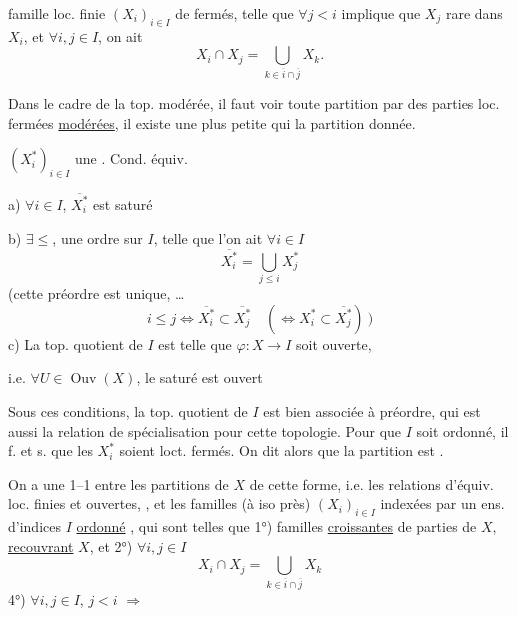 famille loc. finie  $(X_i)_{i\in I}$ de fermés, telle que $\forall j<i$
implique que $X_j$ rare dans $X_i$, et $\forall i,j\in I$,
on ait
\[
X_i\cap X_j=\bigcup_{k\in\overline i\cap\overline j}X_k.
\]

Dans le cadre de la top. modérée, il faut voir 
 toute partition par des parties loc. fermées \uline{modérées},
il existe une plus petite 
  qui
 la partition donnée.


$(X_i^*)_{i\in I}$ une   
. Cond. équiv.

a) $\forall i\in I$, 
$\overline{X_i^*}$ est saturé 

b) $\exists\leq$, une  ordre sur $I$, telle que l'on ait $\forall i\in I$
\[
\overline{X_i^*}=\bigcup_{j\leq i}X_j^*
\]
(cette  préordre est unique, \ldots
\[
i\leq j\Longleftrightarrow\overline{X_i^*}\subset\overline{X_j^*}
\quad(\Longleftrightarrow X_i^*\subset\overline{X_j^*})\ )
\]
c) La top. quotient de $I$ est telle que $\varphi:X\longrightarrow I$ soit ouverte,

i.e. $\forall U\in\operatorname{Ouv}(X)$, le saturé est ouvert

Sous ces conditions, la top. quotient de $I$ est bien
associée à  préordre, qui est aussi
la relation de spécialisation pour cette topologie.
Pour que $I$ soit ordonné, il f. et s. que les
$X_i^*$ soient loct. fermés. On dit alors que la partition est
 .

On a une  1--1 entre les partitions
 de $X$ de cette forme, i.e. les relations d'équiv. loc.
finies et ouvertes, , et les familles (à iso près)
$(X_i)_{i\in I}$ indexées par un ens. d'indices $I$ \uline{ordonné}
,
qui sont telles que 1°) familles \uline{croissantes} de parties
  de $X$, \uline{recouvrant} $X$, et 2°) $\forall i,j\in I$
\[
X_i\cap X_j=\bigcup_{k\in\overline i\cap\overline j}X_k
\]
4°)  $\forall i,j\in I$, $j<i$
$\Longrightarrow$ 


